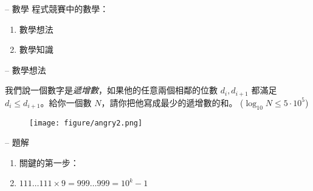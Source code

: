 \documentclass[standalone]{beamer}
\begin{document}
\begin{frame}{\secname -- 數學}
  程式競賽中的數學：

  \begin{enumerate}
    \setlength{\itemindent}{2em}
    \item 數學想法
    \item 數學知識
  \end{enumerate}
\end{frame}

\begin{frame}{{\secname} -- 數學想法}
  \begin{problem}
    我們說一個數字是\emph{遞增數}，如果他的任意兩個相鄰的位數 $d_i, d_{i+1}$
    都滿足 $d_i \leq d_{i+1}$。給你一個數 $N$，請你把他寫成最少的遞增數的和。
    ($\log_{10} N \leq 5 \cdot 10^5$)
  \end{problem} 
  \pause

  \begin{figure}
    \texttt{[image: figure/angry2.png]}
  \end{figure}
\end{frame}

\begin{frame}{{\secname} -- 題解}
  \begin{enumerate}
    \item<+-> 關鍵的第一步：
    \item $111\dots111 \times 9 = 999\dots999 = 10^k - 1$
  \end{enumerate}
\end{frame}
\end{document}
